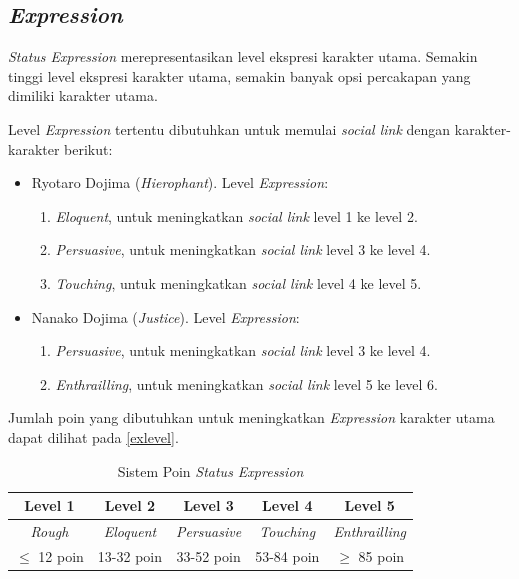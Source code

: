 \subsection{\textit{Expression}}
\textit{Status Expression} merepresentasikan level ekspresi karakter utama. Semakin tinggi level ekspresi karakter utama, semakin banyak opsi percakapan yang dimiliki karakter utama.

Level \textit{Expression} tertentu dibutuhkan untuk memulai \textit{social link} dengan karakter-karakter berikut:
\begin{itemize}
    \item{Ryotaro Dojima (\textit{Hierophant}). Level \textit{Expression}:
                \begin{enumerate}
                    \item \textit{Eloquent}, untuk meningkatkan \textit{social link} level 1 ke level 2.
                    \item \textit{Persuasive}, untuk meningkatkan \textit{social link} level 3 ke level 4.
                    \item \textit{Touching}, untuk meningkatkan \textit{social link} level 4 ke level 5.
                \end{enumerate}
          }
    \item{Nanako Dojima (\textit{Justice}).
                Level \textit{Expression}:
                \begin{enumerate}
                    \item \textit{Persuasive}, untuk meningkatkan \textit{social link} level 3 ke level 4.
                    \item \textit{Enthrailling}, untuk meningkatkan \textit{social link} level 5 ke level 6.
                \end{enumerate}
          }
\end{itemize}

Jumlah poin yang dibutuhkan untuk meningkatkan \textit{Expression} karakter utama dapat dilihat pada \autoref{exlevel}.
\begin{table}[H]
    \caption{\label{exlevel}Sistem Poin \textit{Status Expression}}
    \begin{center}
        \begin{tabular}{ | c | c | c | c | c | }
            \hline
            \textbf{Level 1} & \textbf{Level 2}  & \textbf{Level 3}    & \textbf{Level 4}  & \textbf{Level 5}      \\
            \hline
            \textit{Rough}   & \textit{Eloquent} & \textit{Persuasive} & \textit{Touching} & \textit{Enthrailling} \\
            \hline
            $\le$ 12 poin    & 13-32 poin        & 33-52 poin          & 53-84 poin        & $\ge$ 85 poin         \\
            \hline
        \end{tabular}
    \end{center}
\end{table}

